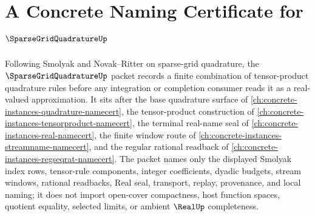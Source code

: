 \chapter{A Concrete Naming Certificate for $\SparseGridQuadratureUp$}
\label{ch:concrete-instances-sparse-grid-quadrature-namecert}

Following Smolyak and Novak--Ritter on sparse-grid quadrature, the $\SparseGridQuadratureUp$ packet records a finite combination of tensor-product quadrature rules before any integration or completion consumer reads it as a real-valued approximation. It sits after the base quadrature surface of \autoref{ch:concrete-instances-quadrature-namecert}, the tensor-product construction of \autoref{ch:concrete-instances-tensorproduct-namecert}, the terminal real-name seal of \autoref{ch:concrete-instances-real-namecert}, the finite window route of \autoref{ch:concrete-instances-streamname-namecert}, and the regular rational readback of \autoref{ch:concrete-instances-regseqrat-namecert}. The packet names only the displayed Smolyak index rows, tensor-rule components, integer coefficients, dyadic budgets, stream windows, rational readbacks, Real seal, transport, replay, provenance, and local naming; it does not import open-cover compactness, host function spaces, quotient equality, selected limits, or ambient $\RealUp$ completeness.

